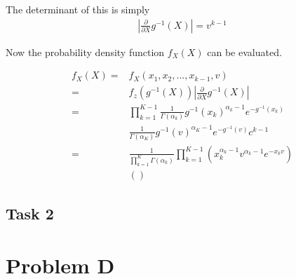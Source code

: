 \documentclass{article}
\begin{document}
The determinant of this is simply
\begin{align}
    \left| \frac{\partial}{\partial X} g^{-1}(X) \right| = v^{k-1} \label{PC:det_of_jacobian}
\end{align}

Now the probability density function $f_X(X)$ can be evaluated. 

\begin{align}
    f_X(X) ={}&  f_X(x_1, x_2, ..., x_{k-1}, v)\\
    ={}& f_z(g^{-1}(X)) \left| \frac{\partial}{\partial X} g^{-1}(X) \right|\\
    ={}& \prod_{k=1}^{K-1} \frac{1}{\Gamma(\alpha_k)} g^{-1}(x_k)^{\alpha_k -1} e^{-g^{-1}(x_k)} \\
    {}& \frac{1}{\Gamma(\alpha_K)} g^{-1}(v)^{\alpha_K -1} e^{-g^{-1}(v)} c^{k-1}\\
    ={}& \frac{1}{\prod_{k=1}^K \Gamma(\alpha_k)} \prod_{k=1}^{K-1} \left( x_k^{\alpha_k-1} v^{\alpha_k-1} e^{-x_k v} \right)\\
    {}& \left( \right)
\end{align}


\subsection{Task 2}

\section{Problem D}
\end{document}
